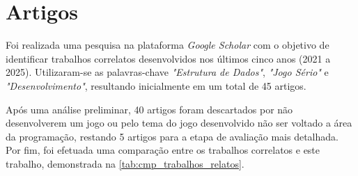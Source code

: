 \section{Artigos}

Foi realizada uma pesquisa na plataforma \emph{Google Scholar} com o objetivo de identificar trabalhos correlatos desenvolvidos nos últimos cinco anos (2021 a 2025). Utilizaram-se as palavras-chave \emph{"Estrutura de Dados"}, \emph{"Jogo Sério"} e \emph{"Desenvolvimento"}, resultando inicialmente em um total de 45 artigos.

Após uma análise preliminar, 40 artigos foram descartados por não desenvolverem um jogo ou pelo tema do jogo desenvolvido não ser voltado a área da programação, restando 5 artigos para a etapa de avaliação mais detalhada. Por fim, foi efetuada uma comparação entre os trabalhos correlatos e este trabalho, demonstrada na \autoref{tab:cmp_trabalhos_relatos}.








